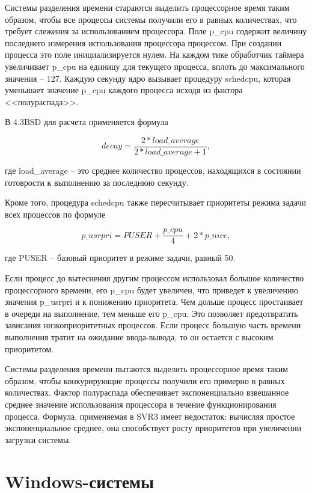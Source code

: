 Системы разделения времени стараются выделить процессорное время таким образом, чтобы все процессы системы получили его в равных количествах, что требует слежения за использованием процессора. Поле p\_cpu содержит величину последнего измерения использования процессора процессом. При создании процесса это поле инициализируется нулем. На каждом тике обработчик таймера увеличивает p\_cpu на единицу для текущего процесса, вплоть до максимального значения – 127. Каждую секунду ядро вызывает процедуру schedcpu, которая уменьшает значение p\_cpu каждого процесса исходя из фактора <<полураспада>>.

В 4.3BSD для расчета применяется формула

\begin{equation}
decay = \frac{2*load\_average}{2*load\_average + 1},
\end{equation}

где load\_average -- это среднее количество процессов, находящихся в состоянии готоврости к выполнению за последнюю секунду.

Кроме того, процедура schedcpu также пересчитывает приоритеты режима задачи всех процессов по формуле

\begin{equation}
p\_usrpri = PUSER + \frac{p\_cpu}{4} + 2*p\_nice,
\end{equation}

где PUSER -- базовый приоритет в режиме задачи, равный 50.

Если процесс до вытеснения другим процессом использовал большое количество процессорного времени, его p\_cpu будет увеличен, что приведет к увеличению значения p\_usrpri и к понижению приоритета. Чем дольше процесс простаивает в очереди на выполнение, тем меньше его p\_cpu. Это позволяет предотвратить зависания низкоприоритетных процессов. Если процесс б$\acute{\textrm{о}}$льшую часть времени выполнения тратит на ожидание ввода-вывода, то он остается с высоким приоритетом.

Системы разделения времени пытаются выделить процессорное время таким образом, чтобы конкурирующие процессы получили его примерно в равных количествах. Фактор полураспада обеспечивает экспоненциально взвешанное среднее значение использования процессора в течение функционирования процесса. Формула, применяемая в SVR3 имеет недостаток: вычисляя простое экспоненциальное среднее, она способствует росту приоритетов при увеличении загрузки системы.

\section{Windows-системы}

